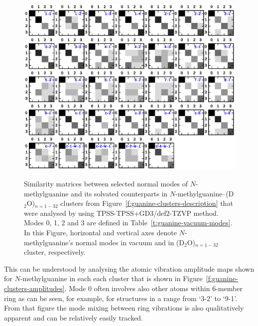 \documentclass[a4paper,titlepage,twoside,fleqn,12pt]{book}
\begin{document}
\begin{refsection}
\begin{figure}[t!]
{\includegraphics[width=0.94\linewidth]{u-mat.eps}
}
\caption{
Similarity matrices between selected normal modes of
$N$-methylguanine and its solvated counterparts
in $N$-methylguanine--(D$_2$O)$_{n=1-32}$ clusters from 
Figure~\ref{f:guanine-clusters-description} that were analysed
by using TPSS-TPSS+GD3/def2-TZVP method. Modes 0, 1, 2 and 3
are defined in Table~\ref{t:guanine-vacuum-modes}.
In this Figure, horizontal and vertical axes denote $N$-methylguanine's
normal modes in vacuum
and in (D$_2$O)$_{n=1-32}$ cluster, respectively.
\label{f:guanine-clusters-umat}}
\end{figure}
%
This can be understood 
by analysing the atomic vibration amplitude maps shown
for $N$-methylguanine in each each cluster
that is shown in Figure~\ref{f:guanine-clusters-amplitudes}.
Mode 0 often
involves also other atoms within 6-member ring as can be seen, for example,
for structures in a range from `3-2' to `9-1'. From that figure
the mode mixing between ring vibrations is also qualitatively
apparent and can be relatively easily tracked.
%
\begin{figure}[t!]
\centering
\setlength\fboxsep{0.4pt}
\setlength\fboxrule{0.5pt}
\end{figure}
\end{refsection}
\end{document}
